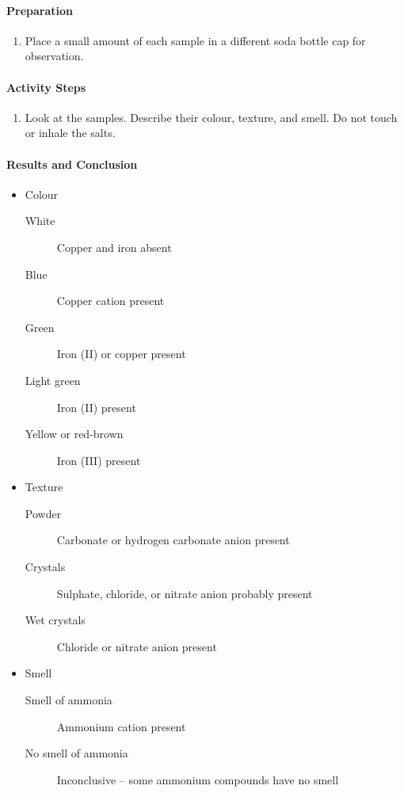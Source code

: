 \paragraph{Preparation}
\begin{enumerate}
\item{Place a small amount of each sample in a different soda bottle cap for observation.}
\end{enumerate}

\paragraph{Activity Steps}
\begin{enumerate}
\item{Look at the samples. Describe their colour, texture, and smell. Do not touch or inhale the salts.}
\end{enumerate}

\paragraph{Results and Conclusion}
\begin{itemize}
\item{Colour}
\begin{description}
\item[White]{Copper and iron absent}
\item[Blue]{Copper cation present}
\item[Green]{Iron (II) or copper present}
\item[Light green]{Iron (II) present}
\item[Yellow or red-brown]{Iron (III) present}
\end{description}
\item{Texture}
\begin{description}
\item[Powder]{Carbonate or hydrogen carbonate anion present}
\item[Crystals]{Sulphate, chloride, or nitrate anion probably present}
\item[Wet crystals]{Chloride or nitrate anion present}
\end{description}
\item{Smell}
\begin{description}
\item[Smell of ammonia]{Ammonium cation present}
\item[No smell of ammonia]{Inconclusive -- some ammonium compounds have no smell}
\end{description}
\end{itemize}

